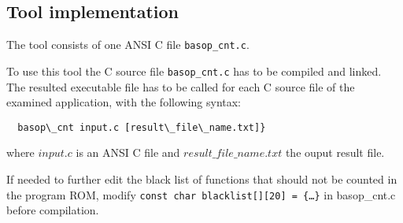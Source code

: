 \subsection{Tool implementation}
The tool consists of one ANSI C file {\tt basop\_cnt.c}. 

To use this tool the C source file {\tt basop\_cnt.c} has to be
compiled and linked. The resulted executable file has to be called for
each C source file of the examined application, with the following
syntax:
\begin{verbatim}
  basop\_cnt input.c [result\_file\_name.txt]}
\end{verbatim}
where $input.c$ is an ANSI C file and $result\_file\_name.txt$ the
ouput result file.

If needed to further edit the black list of functions that should not
be counted in the program ROM, modify {\tt const char blacklist[][20]
= \{{\dots}\}} in basop\_cnt.c before compilation.



